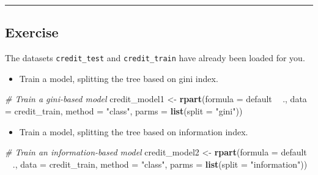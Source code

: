 \documentclass[
]{book}
\newenvironment{Shaded}{\begin{snugshade}}{\end{snugshade}}
\newcommand{\CommentTok}[1]{\textcolor[rgb]{0.56,0.35,0.01}{\textit{#1}}}
\newcommand{\DataTypeTok}[1]{\textcolor[rgb]{0.13,0.29,0.53}{#1}}
\newcommand{\KeywordTok}[1]{\textcolor[rgb]{0.13,0.29,0.53}{\textbf{#1}}}
\newcommand{\NormalTok}[1]{#1}
\newcommand{\OperatorTok}[1]{\textcolor[rgb]{0.81,0.36,0.00}{\textbf{#1}}}
\newcommand{\StringTok}[1]{\textcolor[rgb]{0.31,0.60,0.02}{#1}}
\providecommand{\tightlist}{%
  \setlength{\itemsep}{0pt}\setlength{\parskip}{0pt}}
\begin{document}
\begin{center}\rule{0.5\linewidth}{0.5pt}\end{center}

\hypertarget{exercise-3}{%
\subsection*{Exercise}\label{exercise-3}}

The datasets \texttt{credit\_test} and \texttt{credit\_train} have already been loaded for you.

\begin{itemize}
\tightlist
\item
  Train a model, splitting the tree based on gini index.
\end{itemize}

\begin{Shaded}
\begin{Highlighting}[]
\CommentTok{# Train a gini-based model}
\NormalTok{credit_model1 <-}\StringTok{ }\KeywordTok{rpart}\NormalTok{(}\DataTypeTok{formula =}\NormalTok{ default }\OperatorTok{~}\StringTok{ }\NormalTok{., }
                       \DataTypeTok{data =}\NormalTok{ credit_train, }
                       \DataTypeTok{method =} \StringTok{"class"}\NormalTok{,}
                       \DataTypeTok{parms =} \KeywordTok{list}\NormalTok{(}\DataTypeTok{split =} \StringTok{"gini"}\NormalTok{))}
\end{Highlighting}
\end{Shaded}

\begin{itemize}
\tightlist
\item
  Train a model, splitting the tree based on information index.
\end{itemize}

\begin{Shaded}
\begin{Highlighting}[]
\CommentTok{# Train an information-based model}
\NormalTok{credit_model2 <-}\StringTok{ }\KeywordTok{rpart}\NormalTok{(}\DataTypeTok{formula =}\NormalTok{ default }\OperatorTok{~}\StringTok{ }\NormalTok{., }
                       \DataTypeTok{data =}\NormalTok{ credit_train, }
                       \DataTypeTok{method =} \StringTok{"class"}\NormalTok{,}
                       \DataTypeTok{parms =} \KeywordTok{list}\NormalTok{(}\DataTypeTok{split =} \StringTok{"information"}\NormalTok{))}
\end{Highlighting}
\end{Shaded}
\end{document}
